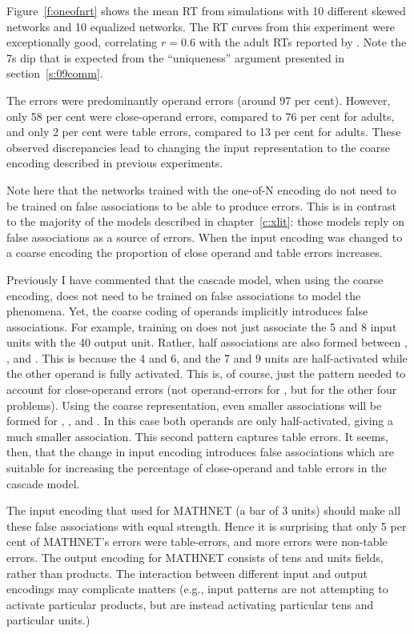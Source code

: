 Figure~\ref{f:oneofnrt} shows the mean RT from simulations with 10
different skewed networks and 10 equalized networks.  The RT curves
from this experiment were exceptionally good, correlating $r=0.6$ with
the adult RTs reported by .  Note the 7s dip that is expected
from the ``uniqueness'' argument presented in section~\ref{s:09comm}.

The errors were predominantly operand errors (around 97 per cent).
However, only 58 per cent were close-operand errors, compared to 76 per
cent for adults, and only 2 per cent were table errors, compared to 13 per
cent for adults. These observed discrepancies lead to changing the input
representation to the coarse encoding described in previous
experiments.

Note here that the networks trained with the one-of-N
encoding do not need to be trained on false associations to be able to
produce errors. This is in contrast to the
majority of the models described in chapter~\ref{c:xlit}: those models
reply on false associations as a source of errors.
When the input encoding was changed to a coarse encoding the proportion of
close operand and table errors increases.



Previously I have commented \cite{dallmemo} that the cascade model, when
using the coarse encoding, does not
need to be trained on false associations to model the phenomena. Yet, the
coarse coding of operands implicitly introduces false associations. For
example, training on  does not just associate the 5 and 8
input units with the 40 output unit.  Rather, half associations are also
formed between , ,  and
.  This is because the 4 and 6, and the 7 and 9 units are
half-activated while the other operand is fully activated. This is, of
course, just the pattern needed to account for close-operand errors (not
operand-errors for , but for the other four problems).  Using the
coarse representation, even smaller associations will be formed for
, ,  and .  In this
case both operands are only half-activated, giving a much smaller
association.  This second pattern captures table errors.  It seems, then,
that the change in input encoding introduces false associations which are
suitable for increasing the percentage of close-operand and table errors in
the cascade model.

The input encoding that  used for MATHNET (a bar of
3 units) should
make all
these false associations with equal strength. Hence it is surprising that
only 5 per cent of MATHNET's
errors were table-errors, and more
errors were non-table errors. The output encoding
for MATHNET consists of tens and units fields, rather than products.  The
interaction between different input
and output encodings may complicate
matters (e.g., input patterns are not attempting to activate particular
products, but are instead activating particular tens and particular units.)

